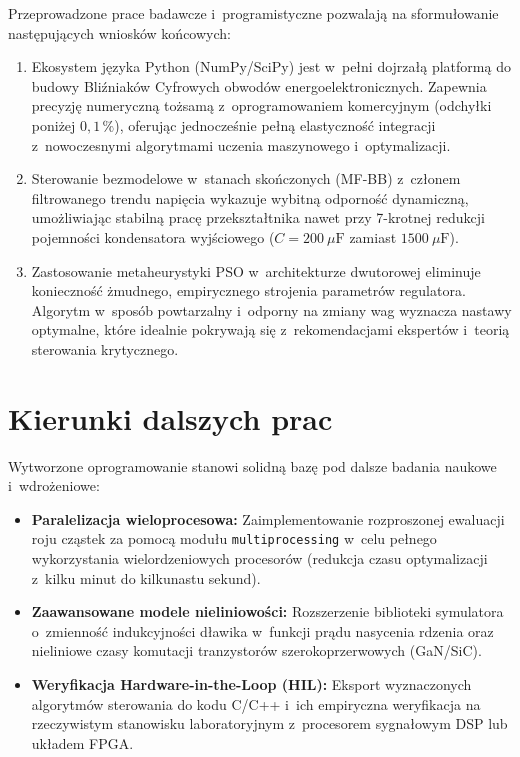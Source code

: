 Przeprowadzone prace badawcze i~programistyczne pozwalają na sformułowanie następujących wniosków końcowych:
\begin{enumerate}
    \item Ekosystem języka Python (NumPy/SciPy) jest w~pełni dojrzałą platformą do budowy Bliźniaków Cyfrowych obwodów energoelektronicznych. Zapewnia precyzję numeryczną tożsamą z~oprogramowaniem komercyjnym (odchyłki poniżej $0{,}1\,\%$), oferując jednocześnie pełną elastyczność integracji z~nowoczesnymi algorytmami uczenia maszynowego i~optymalizacji.
    \item Sterowanie bezmodelowe w~stanach skończonych (MF-BB) z~członem filtrowanego trendu napięcia wykazuje wybitną odporność dynamiczną, umożliwiając stabilną pracę przekształtnika nawet przy 7-krotnej redukcji pojemności kondensatora wyjściowego ($C = 200~\mu\mathrm{F}$ zamiast $1500~\mu\mathrm{F}$).
    \item Zastosowanie metaheurystyki PSO w~architekturze dwutorowej eliminuje konieczność żmudnego, empirycznego strojenia parametrów regulatora. Algorytm w~sposób powtarzalny i~odporny na zmiany wag wyznacza nastawy optymalne, które idealnie pokrywają się z~rekomendacjami ekspertów i~teorią sterowania krytycznego.
\end{enumerate}

\section{Kierunki dalszych prac}
\label{sec:przyszlosc}

Wytworzone oprogramowanie stanowi solidną bazę pod dalsze badania naukowe i~wdrożeniowe:
\begin{itemize}
    \item \textbf{Paralelizacja wieloprocesowa:} Zaimplementowanie rozproszonej ewaluacji roju cząstek za pomocą modułu \texttt{multiprocessing} w~celu pełnego wykorzystania wielordzeniowych procesorów (redukcja czasu optymalizacji z~kilku minut do kilkunastu sekund).
    \item \textbf{Zaawansowane modele nieliniowości:} Rozszerzenie biblioteki symulatora o~zmienność indukcyjności dławika w~funkcji prądu nasycenia rdzenia oraz nieliniowe czasy komutacji tranzystorów szerokoprzerwowych (GaN/SiC).
    \item \textbf{Weryfikacja Hardware-in-the-Loop (HIL):} Eksport wyznaczonych algorytmów sterowania do kodu C/C++ i~ich empiryczna weryfikacja na rzeczywistym stanowisku laboratoryjnym z~procesorem sygnałowym DSP lub układem FPGA.
\end{itemize}

